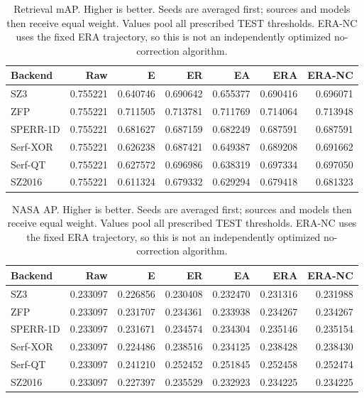 \begin{table}[t]
\centering
\small
\setlength{\tabcolsep}{5pt}
\caption{Retrieval mAP. Higher is better. Seeds are averaged first; sources and models then receive equal weight. Values pool all prescribed TEST thresholds. ERA-NC uses the fixed ERA trajectory, so this is not an independently optimized no-correction algorithm.}
\label{tab:s-ablation-quality-retrieval-AP}
\begin{tabular}{@{}lrrrrrr@{}}
\toprule
Backend & Raw & E & ER & EA & ERA & ERA-NC \\
\midrule
SZ3 & 0.755221 & 0.640746 & 0.690642 & 0.655377 & 0.690416 & 0.696071 \\
ZFP & 0.755221 & 0.711505 & 0.713781 & 0.711769 & 0.714064 & 0.713948 \\
SPERR-1D & 0.755221 & 0.681627 & 0.687159 & 0.682249 & 0.687591 & 0.687591 \\
Serf-XOR & 0.755221 & 0.626238 & 0.687421 & 0.649387 & 0.689208 & 0.691662 \\
Serf-QT & 0.755221 & 0.627572 & 0.696986 & 0.638319 & 0.697334 & 0.697050 \\
SZ2016 & 0.755221 & 0.611324 & 0.679332 & 0.629294 & 0.679418 & 0.681323 \\
\bottomrule
\end{tabular}
\end{table}

\begin{table}[t]
\centering
\small
\setlength{\tabcolsep}{5pt}
\caption{NASA AP. Higher is better. Seeds are averaged first; sources and models then receive equal weight. Values pool all prescribed TEST thresholds. ERA-NC uses the fixed ERA trajectory, so this is not an independently optimized no-correction algorithm.}
\label{tab:s-ablation-quality-anomaly-AP}
\begin{tabular}{@{}lrrrrrr@{}}
\toprule
Backend & Raw & E & ER & EA & ERA & ERA-NC \\
\midrule
SZ3 & 0.233097 & 0.226856 & 0.230408 & 0.232470 & 0.231316 & 0.231988 \\
ZFP & 0.233097 & 0.231707 & 0.234361 & 0.233938 & 0.234267 & 0.234267 \\
SPERR-1D & 0.233097 & 0.231671 & 0.234574 & 0.234304 & 0.235146 & 0.235154 \\
Serf-XOR & 0.233097 & 0.224486 & 0.238516 & 0.234125 & 0.238428 & 0.238430 \\
Serf-QT & 0.233097 & 0.241210 & 0.252452 & 0.251845 & 0.252458 & 0.252474 \\
SZ2016 & 0.233097 & 0.227397 & 0.235529 & 0.232923 & 0.234225 & 0.234225 \\
\bottomrule
\end{tabular}
\end{table}

